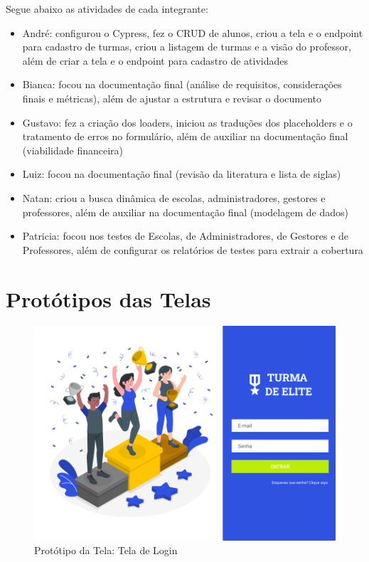 \begin{apendicesenv}
Segue abaixo as atividades de cada integrante:
\begin{itemize}
\item André: configurou o Cypress, fez o CRUD de alunos, criou a tela e o endpoint para cadastro de turmas, criou a listagem de turmas e a visão do professor, além de criar a tela e o endpoint para cadastro de atividades
\item Bianca: focou na documentação final (análise de requisitos, considerações finais e métricas), além de ajustar a estrutura e revisar o documento 
\item Gustavo: fez a criação dos loaders, iniciou as traduções dos placeholders e o tratamento de erros no formulário, além de auxiliar na documentação final (viabilidade financeira)
\item Luiz: focou na documentação final (revisão da literatura e lista de siglas)
\item Natan: criou a busca dinâmica de escolas, administradores, gestores e professores, além de auxiliar na documentação final (modelagem de dados)
\item Patricia: focou nos testes de Escolas, de Administradores, de Gestores e de Professores, além de configurar os relatórios de testes para extrair a cobertura
\end{itemize}

\chapter{Protótipos das Telas}
\label{prototipos}

\begin{figure}[htb]
    \centering
	\includegraphics[width=16cm]{imagens/Geral-Login.png}
	\caption{\label{fig:login} Protótipo da Tela: Tela de Login}
\end{figure}
\FloatBarrier



\end{apendicesenv}
